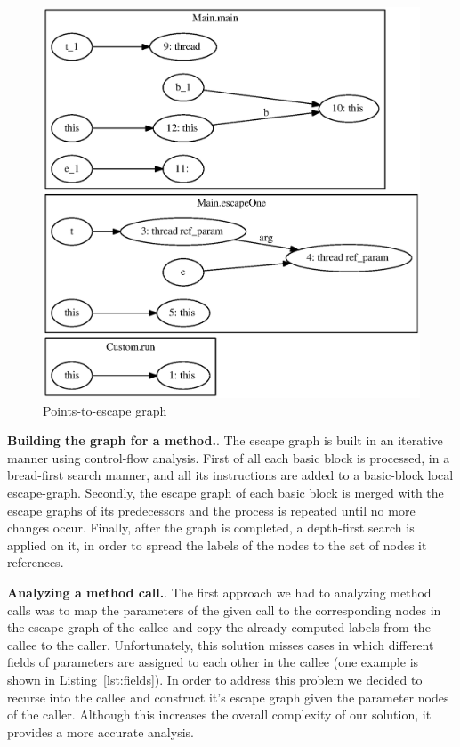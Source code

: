 \documentclass[letterpaper]{article}
\newcommand{\mypar}[1]{{\bf #1.}}
\begin{document}
\begin{figure} \center
 \includegraphics[width=0.8\linewidth]{EscapeTest.eps}
  \caption{Points-to-escape graph}
  \label{fig:escapegraph}
\end{figure}

\mypar{Building the graph for a method}. The escape graph is built in an iterative manner using control-flow analysis.
First of all each basic block is processed, in a bread-first search manner, and all its instructions are added to a
basic-block local escape-graph.
Secondly, the escape graph of each basic block is merged with the escape graphs of its predecessors and the process
is repeated until no more changes occur. Finally, after the graph is completed, a depth-first search is applied on it,
in order to spread the labels of the nodes to the set of nodes it references.

\mypar{Analyzing a method call}. The first approach we had to analyzing method calls was to map the parameters of the given
call to the corresponding nodes in the escape graph of the callee and copy the already computed labels from the callee to the
caller. Unfortunately, this solution misses cases in which different fields of parameters are assigned to each other in the callee
(one example is shown in Listing~\ref{lst:fields}). In order to address this problem we decided to recurse into the callee and
construct it's escape graph given the parameter nodes of the caller. Although this increases the overall complexity of our solution,
it provides a more accurate analysis.
\end{document}
